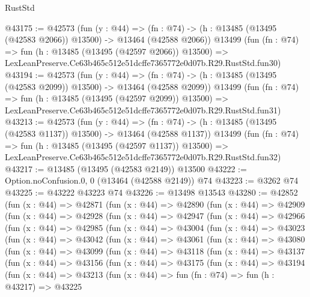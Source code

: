 \begin{lexlean}{RustStd}
\begin{coremodule}
@43175 := @42573
    (fun (y : @44) =>
    (fn : @74) -> (h : @13485 (@13495 (@42583 @2066)) @13500) -> @13464 (@42588 @2066))
    @13499
    (fun (fn : @74) =>
    fun (h : @13485 (@13495 (@42597 @2066)) @13500) =>
    LexLeanPreserve.Ce63b465c512e51dcffe7365772e0d07b.R29.RustStd.fun30)
@43194 := @42573
    (fun (y : @44) =>
    (fn : @74) -> (h : @13485 (@13495 (@42583 @2099)) @13500) -> @13464 (@42588 @2099))
    @13499
    (fun (fn : @74) =>
    fun (h : @13485 (@13495 (@42597 @2099)) @13500) =>
    LexLeanPreserve.Ce63b465c512e51dcffe7365772e0d07b.R29.RustStd.fun31)
@43213 := @42573
    (fun (y : @44) =>
    (fn : @74) -> (h : @13485 (@13495 (@42583 @1137)) @13500) -> @13464 (@42588 @1137))
    @13499
    (fun (fn : @74) =>
    fun (h : @13485 (@13495 (@42597 @1137)) @13500) =>
    LexLeanPreserve.Ce63b465c512e51dcffe7365772e0d07b.R29.RustStd.fun32)
@43217 := @13485 (@13495 (@42583 @2149)) @13500
@43222 := Option.noConfusion.{0, 0} (@13464 (@42588 @2149)) @74
@43223 := @3262 @74
@43225 := @43222 @43223 @74
@43226 := @13498 @13543
@43280 := @42852
    (fun (x : @44) =>
    @42871
      (fun (x : @44) =>
      @42890
        (fun (x : @44) =>
        @42909
          (fun (x : @44) =>
          @42928
            (fun (x : @44) =>
            @42947
              (fun (x : @44) =>
              @42966
                (fun (x : @44) =>
                @42985
                  (fun (x : @44) =>
                  @43004
                    (fun (x : @44) =>
                    @43023
                      (fun (x : @44) =>
                      @43042
                        (fun (x : @44) =>
                        @43061
                          (fun (x : @44) =>
                          @43080
                            (fun (x : @44) =>
                            @43099
                              (fun (x : @44) =>
                              @43118
                                (fun (x : @44) =>
                                @43137
                                  (fun (x : @44) =>
                                  @43156
                                    (fun (x : @44) =>
                                    @43175
                                      (fun (x : @44) =>
                                      @43194
                                        (fun (x : @44) =>
                                        @43213
                                          (fun (x : @44) =>
                                          fun (fn : @74) =>
                                          fun (h : @43217) =>
                                          @43225

\end{coremodule}
\end{lexlean}
